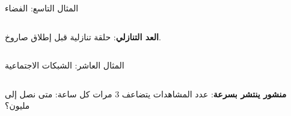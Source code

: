\begin{frame}[t]{المثال التاسع: الفضاء}
    \begin{columns}[T]
        {\small\textbf{العد التنازلي}: حلقة  تنازلية قبل إطلاق صاروخ.\par}
        \vspace{0.3cm}
    \end{columns}
\end{frame}

\begin{frame}[t]{المثال العاشر: الشبكات الاجتماعية}
    \begin{columns}[T]
        {\small\textbf{منشور ينتشر بسرعة}: عدد المشاهدات يتضاعف 3 مرات كل ساعة: متى نصل إلى مليون؟\par}
        \vspace{0.3cm}
    \end{columns}
\end{frame}
